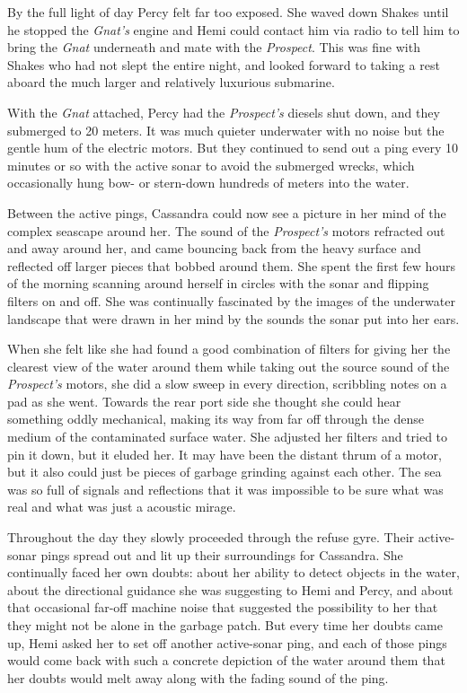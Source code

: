 \documentclass[]{scrbook}
\begin{document}
By the full light of day Percy felt far too exposed. She waved down
Shakes until he stopped the \emph{Gnat's} engine and Hemi could contact
him via radio to tell him to bring the \emph{Gnat} underneath and mate
with the \emph{Prospect}. This was fine with Shakes who had not slept
the entire night, and looked forward to taking a rest aboard the much
larger and relatively luxurious submarine.

With the \emph{Gnat} attached, Percy had the \emph{Prospect's} diesels
shut down, and they submerged to 20 meters. It was much quieter
underwater with no noise but the gentle hum of the electric motors. But
they continued to send out a ping every 10 minutes or so with the active
sonar to avoid the submerged wrecks, which occasionally hung bow- or
stern-down hundreds of meters into the water.

Between the active pings, Cassandra could now see a picture in her mind
of the complex seascape around her. The sound of the \emph{Prospect's}
motors refracted out and away around her, and came bouncing back from
the heavy surface and reflected off larger pieces that bobbed around
them. She spent the first few hours of the morning scanning around
herself in circles with the sonar and flipping filters on and off. She
was continually fascinated by the images of the underwater landscape
that were drawn in her mind by the sounds the sonar put into her ears.

When she felt like she had found a good combination of filters for
giving her the clearest view of the water around them while taking out
the source sound of the \emph{Prospect's} motors, she did a slow sweep
in every direction, scribbling notes on a pad as she went. Towards the
rear port side she thought she could hear something oddly mechanical,
making its way from far off through the dense medium of the contaminated
surface water. She adjusted her filters and tried to pin it down, but it
eluded her. It may have been the distant thrum of a motor, but it also
could just be pieces of garbage grinding against each other. The sea was
so full of signals and reflections that it was impossible to be sure
what was real and what was just a acoustic mirage.

Throughout the day they slowly proceeded through the refuse gyre. Their
active-sonar pings spread out and lit up their surroundings for
Cassandra. She continually faced her own doubts: about her ability to
detect objects in the water, about the directional guidance she was
suggesting to Hemi and Percy, and about that occasional far-off machine
noise that suggested the possibility to her that they might not be alone
in the garbage patch. But every time her doubts came up, Hemi asked her
to set off another active-sonar ping, and each of those pings would come
back with such a concrete depiction of the water around them that her
doubts would melt away along with the fading sound of the ping.
\end{document}
